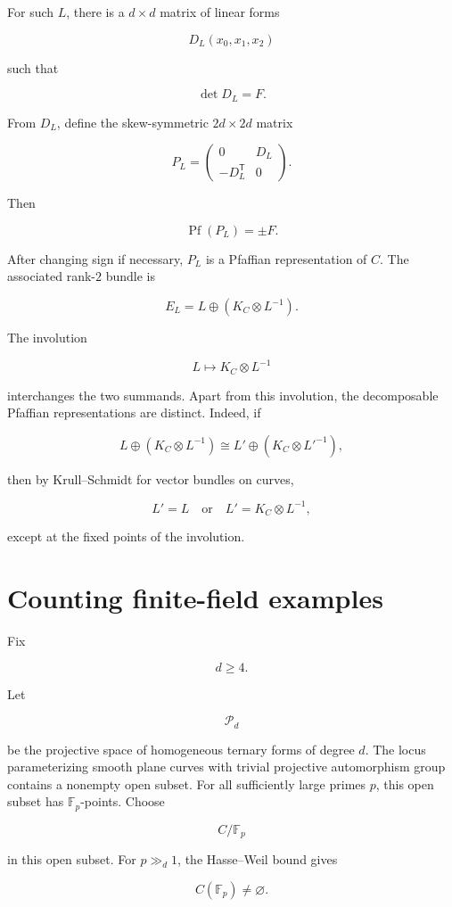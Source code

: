 \documentclass[11pt]{article}
\begin{document}
For such $L$, there is a $d\times d$ matrix of linear forms

\[
D_L(x_0,x_1,x_2)
\]

such that

\[
\det D_L=F.
\]

From $D_L$, define the skew-symmetric $2d\times2d$ matrix

\[
P_L=
\begin{pmatrix}
0 & D_L\\
-D_L^{\mathsf T} & 0
\end{pmatrix}.
\]

Then

\[
\operatorname{Pf}(P_L)=\pm F.
\]

After changing sign if necessary, $P_L$ is a Pfaffian representation of $C$. The associated rank-$2$ bundle is

\[
E_L=L\oplus(K_C\otimes L^{-1}).
\]

The involution

\[
L\longmapsto K_C\otimes L^{-1}
\]

interchanges the two summands. Apart from this involution, the decomposable Pfaffian representations are distinct. Indeed, if

\[
L\oplus(K_C\otimes L^{-1})
\cong
L'\oplus(K_C\otimes L'^{-1}),
\]

then by Krull--Schmidt for vector bundles on curves,

\[
L'=L
\quad\text{or}\quad
L'=K_C\otimes L^{-1},
\]

except at the fixed points of the involution.

\section{Counting finite-field examples}

Fix

\[
d\ge4.
\]

Let

\[
\mathcal P_d
\]

be the projective space of homogeneous ternary forms of degree $d$. The locus parameterizing smooth plane curves with trivial projective automorphism group contains a nonempty open subset. For all sufficiently large primes $p$, this open subset has $\mathbb F_p$-points. Choose

\[
C/\mathbb F_p
\]

in this open subset. For $p\gg_d1$, the Hasse--Weil bound gives

\[
C(\mathbb F_p)\neq\varnothing.
\]
\end{document}
